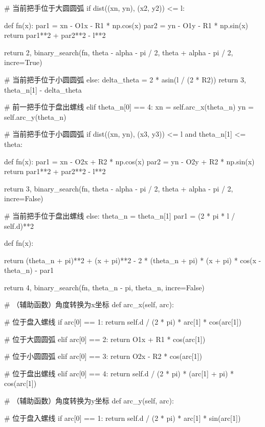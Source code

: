 \documentclass[withoutpreface,bwprint]{cumcmthesis}
\begin{document}
\begin{CodeText}
   # 当前把手位于大圆圆弧
   if dist((xn, yn), (x2, y2)) <= l:

      def fn(x):
           par1 = xn - O1x - R1 * np.cos(x)
           par2 = yn - O1y - R1 * np.sin(x)
           return par1**2 + par2**2 - l**2

      return 2, binary_search(fn, theta - alpha - pi / 2, theta + alpha - pi / 2,
                 incre=True)

   # 当前把手位于小圆圆弧
   else:
      delta_theta = 2 * asin(l / (2 * R2))
      return 3, theta_n[1] - delta_theta

# 前一把手位于盘出螺线
elif theta_n[0] == 4:
   xn = self.arc_x(theta_n)
   yn = self.arc_y(theta_n)

   # 当前把手位于小圆圆弧
   if dist((xn, yn), (x3, y3)) <= l and theta_n[1] <= theta:

      def fn(x):
           par1 = xn - O2x + R2 * np.cos(x)
           par2 = yn - O2y + R2 * np.sin(x)
           return par1**2 + par2**2 - l**2

      return 3, binary_search(fn, theta - alpha - pi / 2, theta + alpha - pi / 2,
                 incre=False)

   # 当前把手位于盘出螺线
   else:
      theta_n = theta_n[1]
      par1 = (2 * pi * l / self.d)**2

      def fn(x):

                 return (theta_n + pi)**2 + (x + pi)**2 - 2 * (theta_n + pi) * (x + pi) *
                           cos(x - theta_n) - par1

             return 4, binary_search(fn, theta_n - pi, theta_n, incre=False)

   # （辅助函数）角度转换为x坐标
   def arc_x(self, arc):

      # 位于盘入螺线
      if arc[0] == 1:
          return self.d / (2 * pi) * arc[1] * cos(arc[1])

      # 位于大圆圆弧
      elif arc[0] == 2:
          return O1x + R1 * cos(arc[1])

      # 位于小圆圆弧
      elif arc[0] == 3:
          return O2x - R2 * cos(arc[1])

      # 位于盘出螺线
      elif arc[0] == 4:
          return self.d / (2 * pi) * (arc[1] + pi) * cos(arc[1])

   # （辅助函数）角度转换为y坐标
   def arc_y(self, arc):

      # 位于盘入螺线
      if arc[0] == 1:
          return self.d / (2 * pi) * arc[1] * sin(arc[1])


\end{CodeText}
\end{document}
